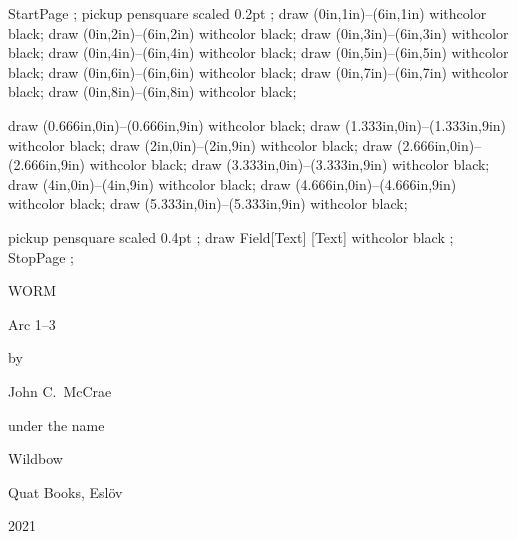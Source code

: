 

StartPage ;
pickup pensquare scaled 0.2pt ;
draw (0in,1in)--(6in,1in) withcolor black;
draw (0in,2in)--(6in,2in) withcolor black;
draw (0in,3in)--(6in,3in) withcolor black;
draw (0in,4in)--(6in,4in) withcolor black;
draw (0in,5in)--(6in,5in) withcolor black;
draw (0in,6in)--(6in,6in) withcolor black;
draw (0in,7in)--(6in,7in) withcolor black;
draw (0in,8in)--(6in,8in) withcolor black;

draw (0.666in,0in)--(0.666in,9in) withcolor black;
draw (1.333in,0in)--(1.333in,9in) withcolor black;
draw (2in,0in)--(2in,9in) withcolor black;
draw (2.666in,0in)--(2.666in,9in) withcolor black;
draw (3.333in,0in)--(3.333in,9in) withcolor black;
draw (4in,0in)--(4in,9in) withcolor black;
draw (4.666in,0in)--(4.666in,9in) withcolor black;
draw (5.333in,0in)--(5.333in,9in) withcolor black;

pickup pensquare scaled 0.4pt ;
draw Field[Text] [Text] withcolor black ;
StopPage ;
\stopuseMPgraphic



\startmakeup[titlepage]

    {\snsfont \subtractfeature[ligature]%
         WORM%
    }

    \blank[10pt]

    {\scd Arc 1--3}

    \blank[15pt]

    {\itb by} 

    \blank[15pt]

     {\scd {} John C.~McCrae}

    \blank[6pt]

    {\itb under the name} 

    \blank[10pt]

    {\scd {} Wildbow}

    \blank[38pt]

    \dontleavehmode \externalfigure[titlepagefloralornament][width=1.7in]

    \blank[38pt]

    {\tfa \addfeature[swash]Q}uat Books, Eslöv \par 2021
\stopmakeup


\startstandardmakeup[page=no,doublesided=no]
\stopstandardmakeup

